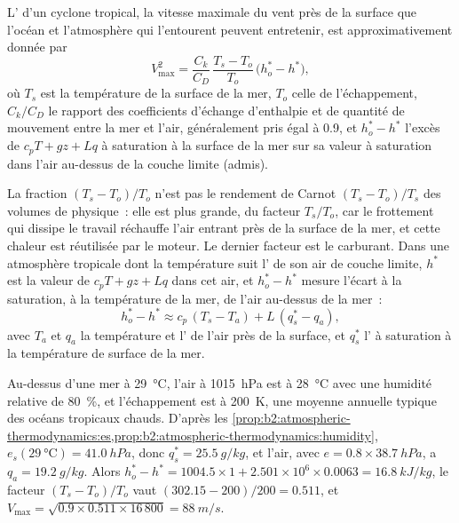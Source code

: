 \begin{proposition}\label{prop:b2:weather-systems:pi}
L'\emph{} d'un cyclone tropical, la vitesse maximale du vent près de la surface que
l'océan et l'atmosphère qui l'entourent peuvent entretenir, est approximativement donnée par
\[
  V_{\max}^2 = \frac{C_k}{C_D}\,\frac{T_s - T_o}{T_o}\,\bigl(h_o^* - h^*\bigr),
\]
où $T_s$ est la température de la surface de la mer, $T_o$ celle de l'échappement, $C_k/C_D$
le rapport des coefficients d'échange d'enthalpie et de quantité de mouvement entre la mer et l'air,
généralement pris égal à 0.9, et $h_o^* - h^*$ l'excès de $c_pT + gz + Lq$ à saturation à la surface de la mer
sur sa valeur à saturation dans l'air au-dessus de la couche limite (admis).
\end{proposition}

La fraction $(T_s - T_o)/T_o$ n'est pas le rendement de Carnot $(T_s - T_o)/T_s$ des
volumes de physique~: elle est plus grande, du facteur $T_s/T_o$, car le frottement qui dissipe le travail réchauffe
l'air entrant près de la surface de la mer, et cette chaleur est réutilisée par le moteur. Le dernier
facteur est le carburant. Dans une atmosphère tropicale dont la température suit l' de son air
de couche limite, $h^*$ est la valeur de $c_pT + gz + Lq$ dans cet air, et $h_o^* - h^*$
mesure l'écart à la saturation, à la température de la mer, de l'air au-dessus de la mer~:
\[
  h_o^* - h^* \approx c_p\,(T_s - T_a) + L\,(q_s^* - q_a),
\]
avec $T_a$ et $q_a$ la température et l' de l'air près de la surface, et
$q_s^*$ l' à saturation à la température de surface de la mer.

\begin{example}\label{ex:b2:weather-systems:pi}
Au-dessus d'une mer à \qty{29}{\celsius}, l'air à \qty{1015}{hPa} est à \qty{28}{\celsius} avec une
humidité relative de \qty{80}{\percent}, et l'échappement est à \qty{200}{K}, une moyenne annuelle typique des océans
tropicaux chauds. D'après les \cref{prop:b2:atmospheric-thermodynamics:es,prop:b2:atmospheric-thermodynamics:humidity},
$e_s(\qty{29}{\celsius}) = \qty{41.0}{hPa}$, donc $q_s^* = \qty{25.5}{g/kg}$, et l'air, avec
$e = 0.8 \times \qty{38.7}{hPa}$, a $q_a = \qty{19.2}{g/kg}$. Alors $h_o^* - h^* = 1004.5 \times
1 + 2.501 \times 10^6 \times 0.0063 = \qty{16.8}{kJ/kg}$, le facteur $(T_s - T_o)/T_o$ vaut
$(302.15 - 200)/200 = 0.511$, et $V_{\max} = \sqrt{0.9 \times 0.511 \times 16\,800} =
\qty{88}{m/s}$.
\end{example}

